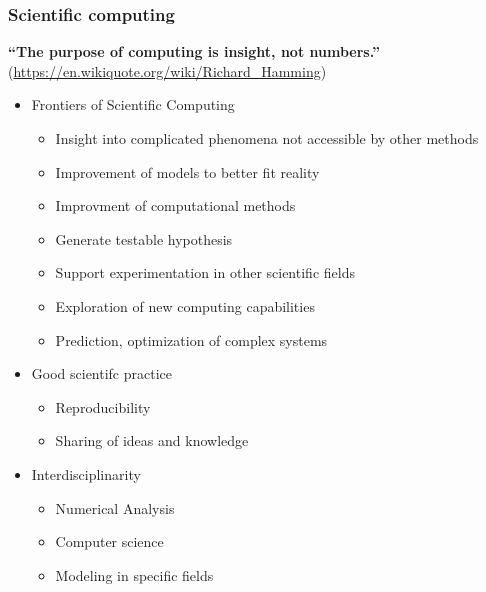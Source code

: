 \begin{frame}\frametitle{Scientific computing}

  \textbf{``The purpose of computing is insight, not numbers.''}\\
  (\url{https://en.wikiquote.org/wiki/Richard_Hamming})

  \begin{itemize}
    \tightlist
  \item
    Frontiers of Scientific Computing

    \begin{itemize}
      \tightlist
    \item
      Insight into complicated phenomena not accessible by other methods
    \item
      Improvement of models to better fit reality
    \item
      Improvment of computational methods
    \item
      Generate testable hypothesis
    \item
      Support experimentation in other scientific fields
    \item
      Exploration of new computing capabilities
    \item
      Prediction, optimization of complex systems
    \end{itemize}
  \item
    Good scientifc practice

    \begin{itemize}
      \tightlist
    \item
      Reproducibility
    \item
      Sharing of ideas and knowledge
    \end{itemize}
  \item
    Interdisciplinarity

    \begin{itemize}
      \tightlist
    \item
      Numerical Analysis
    \item
      Computer science
    \item
      Modeling in specific fields
    \end{itemize}
  \end{itemize}

\end{frame}

